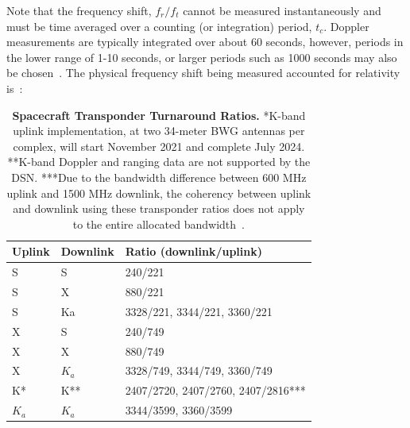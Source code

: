 Note that the frequency shift, $f_r/f_t$ cannot be measured instantaneously and must be time averaged over a counting (or integration) period, $t_c$. Doppler measurements are typically integrated over about 60 seconds, however, periods in the lower range of 1-10 seconds, or larger periods such as 1000 seconds may also be chosen~\cite{Asmar2005}. The physical frequency shift being measured accounted for relativity is~\cite{Soffel1989}:

\begin{table}[htp!]
    \renewcommand{\arraystretch}{1.5}
    \centering
    \caption{
        \textbf{Spacecraft Transponder Turnaround Ratios.} *K-band uplink
        implementation, at two 34-meter BWG antennas per complex, will start
        November 2021 and complete July 2024. **K-band Doppler and ranging data are
        not supported by the DSN. ***Due to the bandwidth difference between 600 MHz
        uplink and 1500 MHz downlink, the coherency between uplink and downlink
        using these transponder ratios does not apply to the entire allocated
        bandwidth~\cite{Berner2020}.
    }
    \label{tab:turnaround-ratios}
    \begin{tabular}{lll}
        \hline
        \textbf{Uplink} & \textbf{Downlink} & \textbf{Ratio (downlink/uplink)}   \\
        \hline\hline
        S               & S                 & 240/221                            \\
        S               & X                 & 880/221                            \\
        S               & Ka                & 3328/221, 3344/221, 3360/221       \\
        X               & S                 & 240/749                            \\
        X               & X                 & 880/749                            \\
        X               & $K_a$             & 3328/749, 3344/749, 3360/749       \\
        K*              & K**               & 2407/2720, 2407/2760, 2407/2816*** \\
        $K_a$           & $K_a$             & 3344/3599, 3360/3599               \\
        \hline
    \end{tabular}
\end{table}

